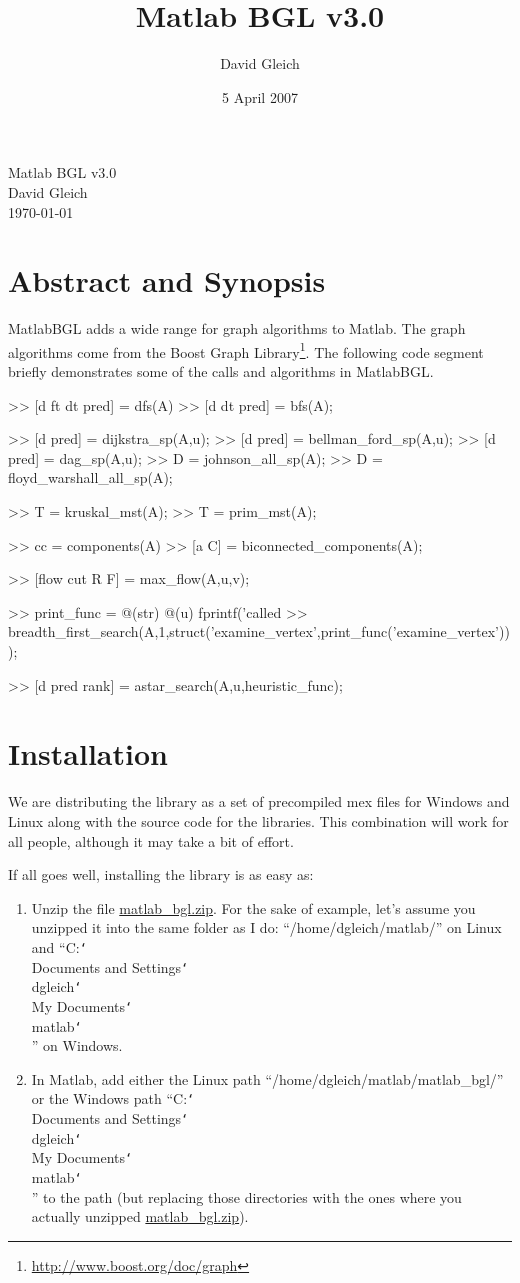 \documentclass[12pt]{article}
\author{David Gleich}
\title{Matlab BGL v3.0}
\date{5 April 2007}
\newcommand{\mypath}[1]{{\ttfamily \small #1}}
\DeclareRobustCommand\cs[1]{\texttt{\char`\\#1}}
\begin{document}
{
\setlength{\parskip}{0pt}
\begin{center}
{\Large Matlab BGL v3.0}\\
David Gleich\\
\today
\end{center}
}
\section*{Abstract and Synopsis}

MatlabBGL adds a wide range for graph algorithms to Matlab.  The graph algorithms come from the Boost Graph Library\footnote{\url{http://www.boost.org/doc/graph}}.  The following code segment briefly demonstrates some of the calls and algorithms in MatlabBGL.

\bigskip

\begin{mcode}
>> [d ft dt pred] = dfs(A)
>> [d dt pred] = bfs(A);

>> [d pred] = dijkstra_sp(A,u);
>> [d pred] = bellman_ford_sp(A,u);
>> [d pred] = dag_sp(A,u);
>> D = johnson_all_sp(A);
>> D = floyd_warshall_all_sp(A);

>> T = kruskal_mst(A);
>> T = prim_mst(A);

>> cc = components(A)  
>> [a C] = biconnected_components(A);

>> [flow cut R F] = max_flow(A,u,v);

>> print_func = @(str) @(u) fprintf('called %
>> breadth_first_search(A,1,struct('examine_vertex',print_func('examine_vertex')));

>> [d pred rank] = astar_search(A,u,heuristic_func);
\end{mcode}

\newpage
{
\setlength{\parskip}{0pt}
\tableofcontents
}
\newpage

\section{Installation}
We are distributing the library as a set of precompiled mex files for Windows and Linux along with the source code for the libraries.  This combination will work for all people, although it may take a bit of effort.

If all goes well, installing the library is as easy as:
\begin{enumerate}
\item	Unzip the file \url{matlab_bgl.zip}.  For the sake of example, let's assume you unzipped it into the same folder as I do: ``\mypath{/home/dgleich/matlab/}'' on Linux and ``\mypath{C:\cs{}Documents and Settings\cs{}dgleich\cs{}My Documents\cs{}matlab\cs{}}'' on Windows.
\item	In Matlab, add either the Linux path ``\mypath{/home/dgleich/matlab/matlab\_bgl/}'' or the Windows path ``\mypath{C:\cs{}Documents and Settings\cs{}dgleich\cs{}My Documents\cs{}matlab\cs{}}'' to the path (but replacing those directories with the ones where you actually unzipped \url{matlab_bgl.zip}).
\end{enumerate}
\end{document}
